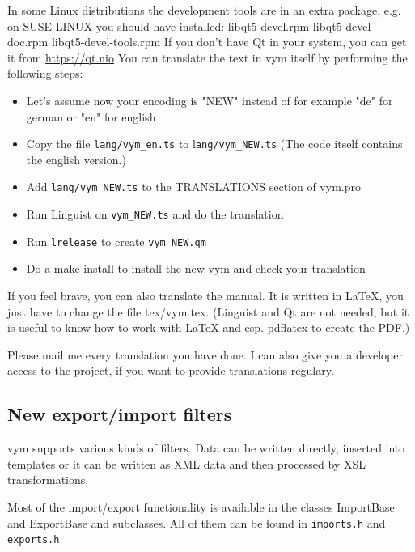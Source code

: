\documentclass[12pt,a4paper]{article}
\newcommand{\vym}{{\sc vym }}
\newenvironment{code}[1] { \verbatim #1}{\endverbatim  }
\begin{document}
\begin{appendix}
In some Linux distributions the development tools are in an extra
package, e.g. on SUSE LINUX you should have installed:
\begin{code}
libqt5-devel.rpm
libqt5-devel-doc.rpm
libqt5-devel-tools.rpm
\end{code}
If you don't have Qt in your system, you can get it from 
    \href{https://qt.io}{https://qt.nio}
    You can translate the text in vym
    itself by performing the following steps:
\begin{itemize}
    \item Let's assume now your encoding is "NEW" instead of for example
    "de" for german or "en" for english
    
    \item Copy the file {\tt lang/vym\_en.ts} to l{\tt ang/vym\_NEW.ts}
    (The code itself contains the english version.)
        
    \item Add {\tt lang/vym\_NEW.ts} to the TRANSLATIONS section of
    vym.pro

    \item Run Linguist on {\tt vym\_NEW.ts} and do the translation

    \item Run {\tt lrelease} to create {\tt vym\_NEW.qm}

    \item Do a make install to install the new vym and check your
    translation
\end{itemize}

If you feel brave, you can also translate the manual. It is written in
LaTeX, you just have to change the file tex/vym.tex. (Linguist and Qt
are not needed, but it is useful to know how to work with LaTeX and esp.
pdflatex to create the PDF.) 

Please mail me every translation you have done. I can also give you a
developer access to the project, if you want to provide translations
regulary.  

\subsection{New export/import filters}
\vym supports various kinds of filters. Data can be written directly,
inserted into templates or it can be written as XML data and then
processed by XSL transformations. 

Most of the import/export functionality is available in the classes
ImportBase and ExportBase and subclasses. All of them can be found in
{\tt imports.h} and {\tt exports.h}.


\end{appendix}
\end{document}
